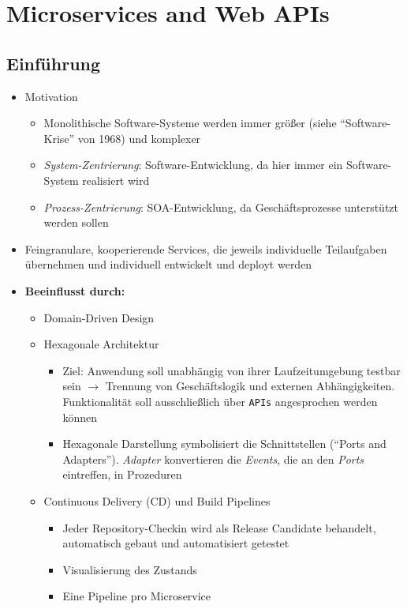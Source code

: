 \section{Microservices and Web APIs}

\subsection{Einführung}
\begin{itemize}
	\item Motivation
	\begin{itemize}
		\item Monolithische Software-Systeme werden immer größer (siehe "`Software-Krise"' von 1968) und komplexer
		\item \textit{System-Zentrierung}: Software-Entwicklung, da hier immer ein Software-System realisiert wird
		\item \textit{Prozess-Zentrierung}: SOA-Entwicklung, da Geschäftsprozesse unterstützt werden sollen
	\end{itemize}
	\item Feingranulare, kooperierende Services, die jeweils individuelle Teilaufgaben übernehmen und individuell entwickelt und deployt werden
	\item \textbf{Beeinflusst durch:}
	\begin{itemize}
		\item Domain-Driven Design
		\item Hexagonale Architektur
		\begin{itemize}
			\item Ziel: Anwendung soll unabhängig von ihrer Laufzeitumgebung testbar sein \(\rightarrow\) Trennung von Geschäftslogik und externen Abhängigkeiten. Funktionalität soll ausschließlich über \texttt{APIs} angesprochen werden können
			\item Hexagonale Darstellung symbolisiert die Schnittstellen ("`Ports and Adapters"'). \textit{Adapter} konvertieren die \textit{Events}, die an den \textit{Ports} eintreffen, in Prozeduren
		\end{itemize}
		\item Continuous Delivery (CD) und Build Pipelines
		\begin{itemize}
			\item Jeder Repository-Checkin wird als Release Candidate behandelt, automatisch gebaut und automatisiert getestet
			\item Visualisierung des Zustands
			\item Eine Pipeline pro Microservice

\end{itemize}
\end{itemize}
\end{itemize}

